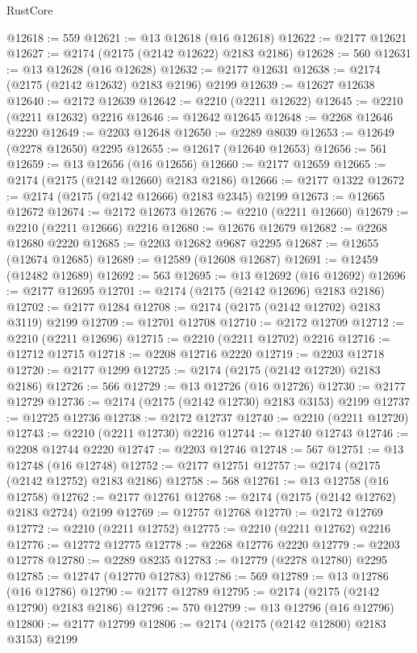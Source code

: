 \begin{lexlean}{RustCore}
\begin{coremodule}
@12618 := 559
@12621 := @13 @12618 (@16 @12618)
@12622 := @2177 @12621
@12627 := @2174 (@2175 (@2142 @12622) @2183 @2186)
@12628 := 560
@12631 := @13 @12628 (@16 @12628)
@12632 := @2177 @12631
@12638 := @2174 (@2175 (@2142 @12632) @2183 @2196) @2199
@12639 := @12627 @12638
@12640 := @2172 @12639
@12642 := @2210 (@2211 @12622)
@12645 := @2210 (@2211 @12632) @2216
@12646 := @12642 @12645
@12648 := @2268 @12646 @2220
@12649 := @2203 @12648
@12650 := @2289 @8039
@12653 := @12649 (@2278 @12650) @2295
@12655 := @12617 (@12640 @12653)
@12656 := 561
@12659 := @13 @12656 (@16 @12656)
@12660 := @2177 @12659
@12665 := @2174 (@2175 (@2142 @12660) @2183 @2186)
@12666 := @2177 @1322
@12672 := @2174 (@2175 (@2142 @12666) @2183 @2345) @2199
@12673 := @12665 @12672
@12674 := @2172 @12673
@12676 := @2210 (@2211 @12660)
@12679 := @2210 (@2211 @12666) @2216
@12680 := @12676 @12679
@12682 := @2268 @12680 @2220
@12685 := @2203 @12682 @9687 @2295
@12687 := @12655 (@12674 @12685)
@12689 := @12589 (@12608 @12687)
@12691 := @12459 (@12482 @12689)
@12692 := 563
@12695 := @13 @12692 (@16 @12692)
@12696 := @2177 @12695
@12701 := @2174 (@2175 (@2142 @12696) @2183 @2186)
@12702 := @2177 @1284
@12708 := @2174 (@2175 (@2142 @12702) @2183 @3119) @2199
@12709 := @12701 @12708
@12710 := @2172 @12709
@12712 := @2210 (@2211 @12696)
@12715 := @2210 (@2211 @12702) @2216
@12716 := @12712 @12715
@12718 := @2208 @12716 @2220
@12719 := @2203 @12718
@12720 := @2177 @1299
@12725 := @2174 (@2175 (@2142 @12720) @2183 @2186)
@12726 := 566
@12729 := @13 @12726 (@16 @12726)
@12730 := @2177 @12729
@12736 := @2174 (@2175 (@2142 @12730) @2183 @3153) @2199
@12737 := @12725 @12736
@12738 := @2172 @12737
@12740 := @2210 (@2211 @12720)
@12743 := @2210 (@2211 @12730) @2216
@12744 := @12740 @12743
@12746 := @2208 @12744 @2220
@12747 := @2203 @12746
@12748 := 567
@12751 := @13 @12748 (@16 @12748)
@12752 := @2177 @12751
@12757 := @2174 (@2175 (@2142 @12752) @2183 @2186)
@12758 := 568
@12761 := @13 @12758 (@16 @12758)
@12762 := @2177 @12761
@12768 := @2174 (@2175 (@2142 @12762) @2183 @2724) @2199
@12769 := @12757 @12768
@12770 := @2172 @12769
@12772 := @2210 (@2211 @12752)
@12775 := @2210 (@2211 @12762) @2216
@12776 := @12772 @12775
@12778 := @2268 @12776 @2220
@12779 := @2203 @12778
@12780 := @2289 @8235
@12783 := @12779 (@2278 @12780) @2295
@12785 := @12747 (@12770 @12783)
@12786 := 569
@12789 := @13 @12786 (@16 @12786)
@12790 := @2177 @12789
@12795 := @2174 (@2175 (@2142 @12790) @2183 @2186)
@12796 := 570
@12799 := @13 @12796 (@16 @12796)
@12800 := @2177 @12799
@12806 := @2174 (@2175 (@2142 @12800) @2183 @3153) @2199

\end{coremodule}
\end{lexlean}
